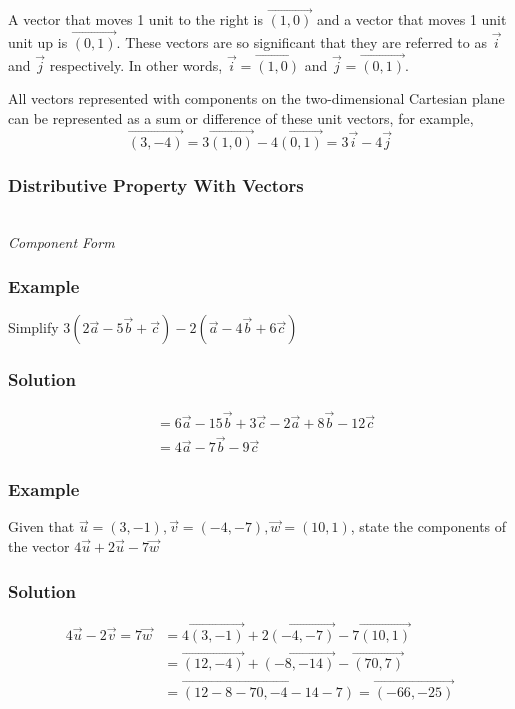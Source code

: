 \documentclass{article}
\begin{document}
A vector that moves 1 unit to the right is $\overrightarrow{(1,0)}$ and a vector that moves 1 unit unit up is $\overrightarrow{(0,1)}$. These vectors are so significant that they are referred to as $\vec{i}$ and $\vec{j}$ respectively. In other words, $\vec{i}=\overrightarrow{(1,0)}$ and $\vec{j}=\overrightarrow{(0,1)}$.

All vectors represented with components on the two-dimensional Cartesian plane can be represented as a sum or difference of these unit vectors, for example,\\
$$\overrightarrow{(3,-4)}=3\overrightarrow{(1,0)}-4\overrightarrow{(0,1)}=3\vec{i}-4\vec{j}$$

\subsubsection{Distributive Property With Vectors}
\\

\textit{Component Form}
\subsubsection*{Example}
Simplify $3(2\vec{a}-5\vec{b}+\vec{c})-2(\vec{a}-4\vec{b}+6\vec{c})$
\subsubsection*{Solution}
\begin{align*}
    &=6\vec{a}-15\vec{b}+3\vec{c}-2\vec{a}+8\vec{b}-12\vec{c}\\
    &=4\vec{a}-7\vec{b}-9\vec{c}
\end{align*}
\subsubsection*{Example}
Given that $\vec{u}=(3,-1), \vec{v}=(-4,-7), \vec{w}=(10,1)$, state the components of the vector $4\vec{u}+2\vec{u}-7\vec{w}$
\subsubsection*{Solution}
\begin{align*}
    4\vec{u}-2\vec{v}=7\vec{w}&=4\overrightarrow{(3,-1)}+2\overrightarrow{(-4,-7)}-7\overrightarrow{(10,1)}\\
    &=\overrightarrow{(12,-4)}+\overrightarrow{(-8,-14)}-\overrightarrow{(70,7)}\\
    &=\overrightarrow{(12-8-70,-4-14-7)}=\overrightarrow{(-66,-25)}
\end{align*}
\end{document}
